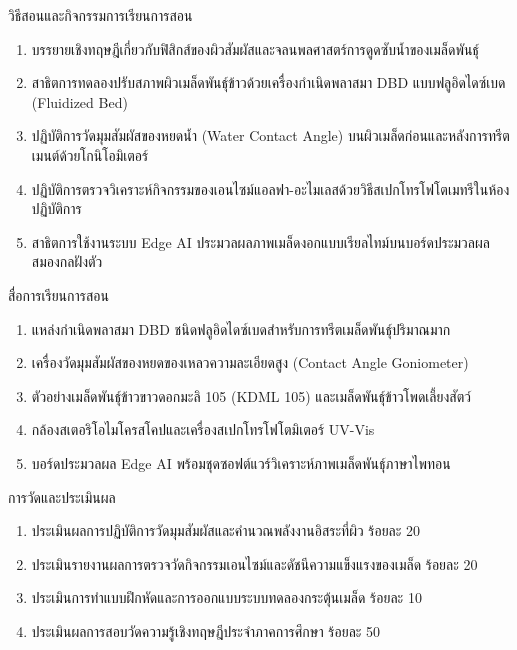 \newpage

\begin{planbox}{วิธีสอนและกิจกรรมการเรียนการสอน}
\begin{enumerate}
    \item บรรยายเชิงทฤษฎีเกี่ยวกับฟิสิกส์ของผิวสัมผัสและจลนพลศาสตร์การดูดซับน้ำของเมล็ดพันธุ์
    \item สาธิตการทดลองปรับสภาพผิวเมล็ดพันธุ์ข้าวด้วยเครื่องกำเนิดพลาสมา DBD แบบฟลูอิดไดซ์เบด (Fluidized Bed)
    \item ปฏิบัติการวัดมุมสัมผัสของหยดน้ำ (Water Contact Angle) บนผิวเมล็ดก่อนและหลังการทรีตเมนต์ด้วยโกนิโอมิเตอร์
    \item ปฏิบัติการตรวจวิเคราะห์กิจกรรมของเอนไซม์แอลฟา-อะไมเลสด้วยวิธีสเปกโทรโฟโตเมทรีในห้องปฏิบัติการ
    \item สาธิตการใช้งานระบบ Edge AI ประมวลผลภาพเมล็ดงอกแบบเรียลไทม์บนบอร์ดประมวลผลสมองกลฝังตัว
\end{enumerate}
\end{planbox}

\begin{planbox}{สื่อการเรียนการสอน}
\begin{enumerate}
    \item แหล่งกำเนิดพลาสมา DBD ชนิดฟลูอิดไดซ์เบดสำหรับการทรีตเมล็ดพันธุ์ปริมาณมาก
    \item เครื่องวัดมุมสัมผัสของหยดของเหลวความละเอียดสูง (Contact Angle Goniometer)
    \item ตัวอย่างเมล็ดพันธุ์ข้าวขาวดอกมะลิ 105 (KDML 105) และเมล็ดพันธุ์ข้าวโพดเลี้ยงสัตว์
    \item กล้องสเตอริโอไมโครสโคปและเครื่องสเปกโทรโฟโตมิเตอร์ UV-Vis
    \item บอร์ดประมวลผล Edge AI พร้อมชุดซอฟต์แวร์วิเคราะห์ภาพเมล็ดพันธุ์ภาษาไพทอน
\end{enumerate}
\end{planbox}

\begin{planbox}{การวัดและประเมินผล}
\begin{enumerate}
    \item ประเมินผลการปฏิบัติการวัดมุมสัมผัสและคำนวณพลังงานอิสระที่ผิว ร้อยละ 20
    \item ประเมินรายงานผลการตรวจวัดกิจกรรมเอนไซม์และดัชนีความแข็งแรงของเมล็ด ร้อยละ 20
    \item ประเมินการทำแบบฝึกหัดและการออกแบบระบบทดลองกระตุ้นเมล็ด ร้อยละ 10
    \item ประเมินผลการสอบวัดความรู้เชิงทฤษฎีประจำภาคการศึกษา ร้อยละ 50
\end{enumerate}
\end{planbox}

